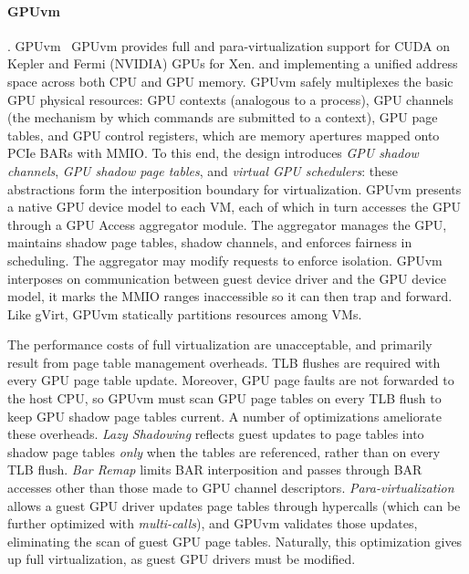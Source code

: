 \paragraph {\bf GPUvm}.
      GPUvm~\cite{GPUvm} GPUvm provides full and para-virtualization support for
	  CUDA on Kepler and Fermi (NVIDIA) GPUs for Xen.
	  and implementing a unified address space across both CPU and GPU memory.
	  GPUvm safely multiplexes the basic GPU physical resources: GPU contexts (analogous to a process), GPU channels (the mechanism
	  by which commands are submitted to a context), GPU page tables, and GPU control registers, which are memory apertures
	  mapped onto PCIe BARs with MMIO.
	  To this end, the design introduces \emph{GPU shadow
	  channels}, \emph{GPU shadow page tables}, and \emph{virtual GPU schedulers}: these abstractions
	  form the interposition boundary for virtualization.
	  GPUvm presents a native GPU device model to each VM, each of which in turn accesses the GPU through a
	  GPU Access aggregator module. The aggregator manages the GPU, maintains shadow page tables, shadow
	  channels, and enforces fairness in scheduling. The aggregator may modify requests to enforce isolation.
	  GPUvm interposes on communication between guest device driver and the GPU device model, it marks the MMIO
	  ranges inaccessible so it can then trap and forward. Like gVirt, GPUvm statically partitions resources among VMs.

	  The performance costs of full virtualization are unacceptable, and primarily result from page table
	  management overheads. TLB flushes are required with every GPU page table update. Moreover, GPU page faults
	  are not forwarded to the host CPU, so GPUvm must scan GPU page tables on every TLB flush to keep
	  GPU shadow page tables current. A number of optimizations ameliorate these overheads.
	  \emph{Lazy Shadowing} reflects guest updates to page tables into shadow page tables
	        \emph{only} when the tables are referenced, rather than on every TLB flush.
	  \emph{Bar Remap} limits BAR interposition and passes through BAR accesses other than those made to GPU channel descriptors.
	  \emph{Para-virtualization} allows a guest GPU driver updates page tables through hypercalls (which can
	  be further optimized with \emph{multi-calls}), and GPUvm
	        validates those updates, eliminating the scan of guest GPU page tables. Naturally, this optimization
			gives up full virtualization, as guest GPU drivers must be modified.





